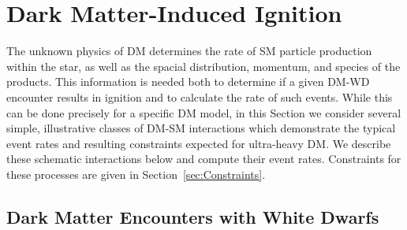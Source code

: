 \documentclass[twocolumn, preprintnumbers,amsmath,amssymb,prd, superscriptaddress]{revtex4}
\newcommand{\GeV}{\text{GeV}}
\newcommand{\cm}{\text{cm}}
\begin{document}


\section{Dark Matter-Induced Ignition}
\label{sec:DMexplode}

The unknown physics of DM determines the rate of SM particle production within the star, as well as the spacial distribution, momentum, and species of the products.
This information is needed both to determine if a given DM-WD encounter results in ignition and to calculate the rate of such events.
While this can be done precisely for a specific DM model, in this Section we consider several simple, illustrative classes of DM-SM interactions which demonstrate the typical event rates and resulting constraints expected for ultra-heavy DM.
We describe these schematic interactions below and compute their event rates.
Constraints for these processes are given in Section~\ref{sec:Constraints}.

\subsection{Dark Matter Encounters with White Dwarfs}
\end{document}
